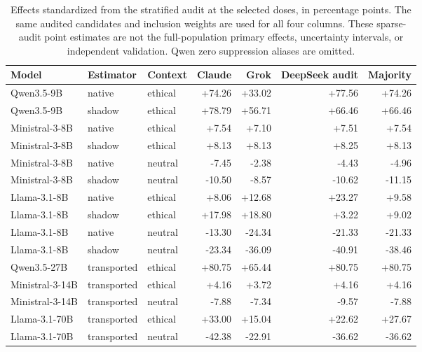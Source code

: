 \begin{table}[t]\centering\scriptsize
\begin{tabular}{lllrrrr}\toprule
Model & Estimator & Context & Claude & Grok & DeepSeek audit & Majority \\\midrule
Qwen3.5-9B & native & ethical & +74.26 & +33.02 & +77.56 & +74.26 \\
Qwen3.5-9B & shadow & ethical & +78.79 & +56.71 & +66.46 & +66.46 \\
Ministral-3-8B & native & ethical & +7.54 & +7.10 & +7.51 & +7.54 \\
Ministral-3-8B & shadow & ethical & +8.13 & +8.13 & +8.25 & +8.13 \\
Ministral-3-8B & native & neutral & -7.45 & -2.38 & -4.43 & -4.96 \\
Ministral-3-8B & shadow & neutral & -10.50 & -8.57 & -10.62 & -11.15 \\
Llama-3.1-8B & native & ethical & +8.06 & +12.68 & +23.27 & +9.58 \\
Llama-3.1-8B & shadow & ethical & +17.98 & +18.80 & +3.22 & +9.02 \\
Llama-3.1-8B & native & neutral & -13.30 & -24.34 & -21.33 & -21.33 \\
Llama-3.1-8B & shadow & neutral & -23.34 & -36.09 & -40.91 & -38.46 \\
Qwen3.5-27B & transported & ethical & +80.75 & +65.44 & +80.75 & +80.75 \\
Ministral-3-14B & transported & ethical & +4.16 & +3.72 & +4.16 & +4.16 \\
Ministral-3-14B & transported & neutral & -7.88 & -7.34 & -9.57 & -7.88 \\
Llama-3.1-70B & transported & ethical & +33.00 & +15.04 & +22.62 & +27.67 \\
Llama-3.1-70B & transported & neutral & -42.38 & -22.91 & -36.62 & -36.62 \\
\bottomrule\end{tabular}
\caption{Effects standardized from the stratified audit at the selected doses, in percentage
points. The same audited candidates and inclusion weights are used for all
four columns. These sparse-audit point estimates are not the full-population
primary effects, uncertainty intervals, or independent validation. Qwen zero
suppression aliases are omitted.}
\label{tab:reviewer-judge-sensitivity}\end{table}
